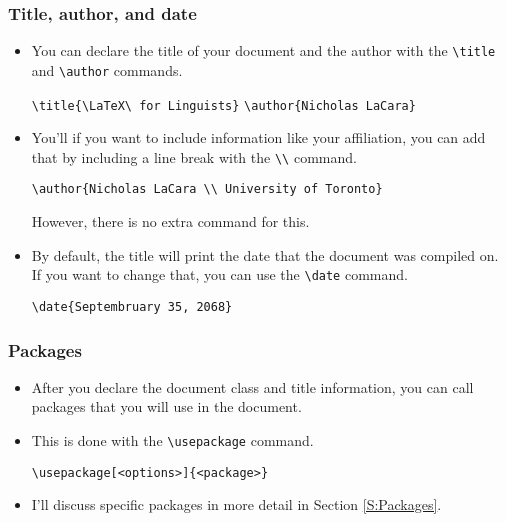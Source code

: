 \documentclass[11pt, letterpaper]{article}
\begin{document}
  \subsubsection{Title, author, and date}
  
    \begin{itemize}
      \item You can declare the title of your document and the author with the \verb+\title+ and \verb+\author+ commands.
      
	\begin{exe}
	  \ex \verb+\title{\LaTeX\ for Linguists}+
	  \ex \verb+\author{Nicholas LaCara}+
	\end{exe}
	
      \item You'll if you want to include information like your affiliation, you can add that by including a line break with the \verb+\\+ command.
      
	\begin{exe}
	  \ex \verb+\author{Nicholas LaCara \\ University of Toronto}+
	\end{exe}
	
      However, there is no extra command for this.


      \item By default, the title will print the date that the document was compiled on. If you want to change that, you can use the \verb+\date+ command.
      
	\begin{exe}
	  \ex \verb+\date{Septembruary 35, 2068}+
	\end{exe}

      
    \end{itemize}

  
  \subsubsection{Packages}
  
    \begin{itemize}
      \item After you declare the document class and title information, you can call packages that you will use in the document.
      
      \item This is done with the \verb+\usepackage+ command.
      
	\begin{exe}
	  \ex \verb+\usepackage[<options>]{<package>}+
	\end{exe}

      \item I'll discuss specific packages in more detail in Section \ref{S:Packages}.
	
    \end{itemize}
\end{document}
